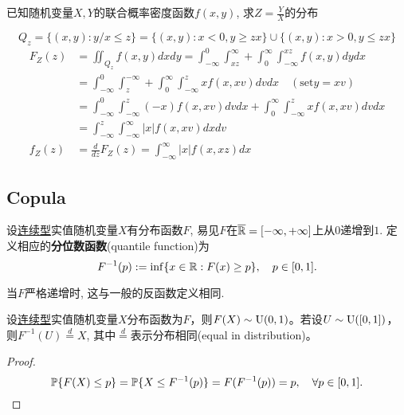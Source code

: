 \begin{example}[连续变量之商]\label{ex:quotient_of_variable}
    已知随机变量$X,Y$的联合概率密度函数$f(x,y)$, 求$Z=\frac{Y}{X}$的分布
\end{example}
\begin{solution}
    \[ Q_{z}=\{(x, y): y / x \le z\}=\{(x, y): x<0, y \geq z x\} \cup\{(x, y): x>0, y \le z x\} \]
    \begin{align*}
        F_{Z}(z) & =\iint_{Q_{z}} f(x, y) d x d y=\int_{-\infty}^{0} \int_{x z}^{\infty}+\int_{0}^{\infty} \int_{-\infty}^{x z} f(x, y) d y d x \\
                 & =\int_{-\infty}^{0} \int_{z}^{-\infty}+\int_{0}^{\infty} \int_{-\infty}^{z} x f(x, x v) d v d x \quad(\text{set} y=x v)      \\
                 & =\int_{-\infty}^{0} \int_{-\infty}^{z}(-x) f(x, x v) d v d x+\int_{0}^{\infty} \int_{-\infty}^{z} x f(x, xv) dvdx            \\
                 & =\int_{-\infty}^{z} \int_{-\infty}^{\infty}|x| f(x, xv) dxdv                                                                 \\
        f_Z(z)   & =\frac{d}{dz}F_Z(z)=\int_{-\infty}^{\infty}|x|f(x,xz)dx
    \end{align*}
\end{solution}

\subsection{Copula}\label{subsec:Copula}

\begin{definition}
    设\underline{连续型}实值随机变量$X$有分布函数$F$, 易见$F$在$\overline{\R}=[-\infty,+\infty] $上从$0$递增到$1$. 定义相应的\textbf{分位数函数}(quantile function)为
    \[ F^{-1}(p) := \inf\{x\in\R:F(x)\ge p\}, \quad p \in [0,1]. \]
\end{definition}
\begin{remark}
    当$F$严格递增时, 这与一般的反函数定义相同.
\end{remark}

\begin{theorem}\label{thm:pseudo_random_generation}
    设\underline{连续型}实值随机变量$X$分布函数为$F$，则$F(X) \sim \U(0,1)$。若设$U \sim \U([0,1])$，则$F^{-1}(U) \overset{d}{=} X$, 其中$\overset{d}{=}$表示分布相同(equal in distribution)。
\end{theorem}
\begin{proof}
    \[ \P\{F(X)\le p\} = \P\{X\le F^{-1}(p)\} = F(F^{-1}(p)) =p, \quad \forall p \in [0,1]. \]
\end{proof}

